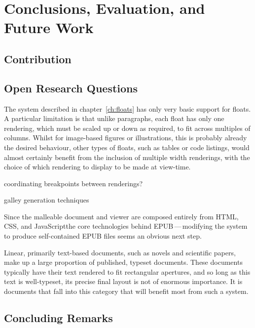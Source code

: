 \chapter{Conclusions, Evaluation, and Future Work}\label{ch:conclusions}

\section{Contribution}

\section{Open Research Questions}

The system described in chapter~\ref{ch:floats} has only very basic support for floats. A particular limitation is that unlike paragraphs, each float has only one rendering, which must be scaled up or down as required, to fit across multiples of columns. Whilst for image-based figures or illustrations, this is probably already the desired behaviour, other types of floats, such as tables or code listings, would almost certainly benefit from the inclusion of multiple width renderings, with the choice of which rendering to display to be made at view-time. %

coordinating breakpoints between renderings?

galley generation techniques


Since the malleable document and viewer are composed entirely from HTML, CSS, and JavaScript\ed the core technologies behind EPUB\,---\,modifying the system to produce self-contained EPUB files seems an obvious next step.

Linear, primarily text-based documents, such as novels and scientific papers, make up a large proportion of published, typeset documents. These documents typically have their text rendered to fit rectangular apertures, and so long as this text is well-typeset, its precise final layout is not of enormous importance. It is documents that fall into this category that will benefit most from such a system. %

\section{Concluding Remarks}
